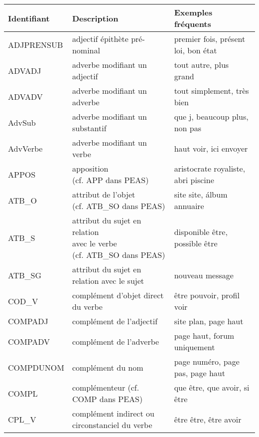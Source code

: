 \documentclass[oneside,parskip,draft]{scrbook}
\makeatletter
\newcommand{\specialcell}[2][l]{%
      \begin{tabular}[#1]{@{}l@{}}#2\end{tabular}}
\makeatother
\begin{document}
\begin{longtable}{lll}
    \toprule
    Identifiant   & Description & Exemples fréquents \\ \midrule
    ADJPRENSUB    &  adjectif épithète pré-nominal         & premier fois, présent loi, bon état \\ \midrule
    ADVADJ        &  adverbe modifiant un adjectif         & tout autre, plus grand \\ \midrule
    ADVADV        &  adverbe modifiant un adverbe          & tout simplement, très bien \\ \midrule
    AdvSub        &  adverbe modifiant un substantif       & que j, beaucoup plus, non pas \\ \midrule
    AdvVerbe      &  adverbe modifiant un verbe            & haut voir, ici envoyer \\ \midrule
    APPOS         &  \specialcell{apposition \\ (cf. APP dans PEAS)} & aristocrate royaliste, abri piscine \\ \midrule
    ATB\_O        &  \specialcell{attribut de l'objet \\ (cf. ATB\_SO dans PEAS)} & site site, álbum annuaire \\ \midrule
    ATB\_S        &  \specialcell{attribut du sujet en relation \\ avec le verbe \\ (cf. ATB\_SO dans PEAS)} & disponible être, possible être \\ \midrule
    ATB\_SG       &  attribut du sujet en relation avec le sujet & nouveau message \\ \midrule
    COD\_V        &  complément d'objet direct du verbe    & être pouvoir,  profil voir \\ \midrule
    COMPADJ       &  complément de l'adjectif              & site plan, page haut \\ \midrule
    COMPADV       &  complément de l'adverbe               & page haut, forum uniquement \\ \midrule
    COMPDUNOM     &  complément du nom                     & page numéro, page pas, page haut \\ \midrule
    COMPL         &  complémenteur (cf. COMP dans PEAS)    & que être, que avoir, si être \\ \midrule
    CPL\_V        &  \specialcell{complément indirect ou \\ circonstanciel du verbe } & être être, être avoir  \\ \midrule

\end{longtable}
\end{document}
